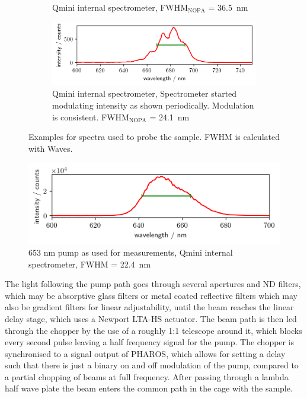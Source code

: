 \documentclass[twoside,openright]{scrreprt}
\begin{document}
\begin{figure}[hbtp]
\begin{subfigure}[b]{\textwidth}
\caption{Qmini internal spectrometer, FWHM$_{\mathrm{NOPA}}$ = \SI{36.5}{\nano\meter}}
\end{subfigure}
\begin{subfigure}[b]{\textwidth}
\centering
\includegraphics[scale=1]{images/spectra/2024-02-05/probe_3H_680nm.png}
\caption{Qmini internal spectrometer, Spectrometer started modulating intensity as shown periodically. Modulation is consistent. FWHM$_{\mathrm{NOPA}}$ = \SI{24.1}{\nano\meter}\label{fig:spectrometerMalfunction}}
\end{subfigure}
\caption{Examples for spectra used to probe the sample. FWHM is calculated with Waves.\label{fig:probeSpectra}}
\end{figure}

\begin{figure}[hbt]
\centering
\includegraphics[scale=1]{images/spectra/2024-02-05/pump_2H_653nm.png}
\caption{653 nm pump as used for measurements, Qmini internal spectrometer, FWHM = \SI{22.4}{\nano\meter}\label{fig:specRefPump}}
\end{figure}

The light following the pump path goes through several apertures and ND filters, which may be absorptive glass filters or metal coated reflective filters which may also be gradient filters for linear adjustability, until the beam reaches the linear delay stage, which uses a Newport LTA-HS actuator. The beam path is then led through the chopper by the use of a roughly 1:1 telescope around it, which blocks every second pulse leaving a half frequency signal for the pump. The chopper is synchronised to a signal output of PHAROS, which allows for setting a delay such that there is just a binary on and off modulation of the pump, compared to a partial chopping of beams at full frequency. After passing through a lambda half wave plate the beam enters the common path in the cage with the sample.
\end{document}
